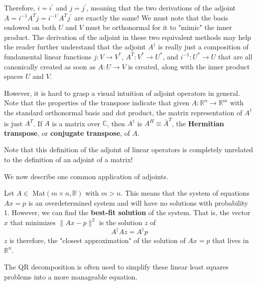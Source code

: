   Therefore, $i = i^\prime$ and $j = j^\prime$, meaning that the two derivations of the adjoint $A = i^{-1} A^T j = i^{-1 \prime} A^T j^\prime$ are exactly the same! We must note that the basis endowed on both $U$ and $V$ must be orthonormal for it to "mimic" the inner product. The derivation of the adjoint in these two equivalent methods may help the reader further understand that the adjoint $A^\dagger$ is really just a composition of fundamental linear functions $j: V \longrightarrow V^\ast$, $A^T: V^\ast \longrightarrow U^\ast$, and $i^{-1}: U^\ast \longrightarrow U$ that are all canonically created as soon as $A: U \longrightarrow V$ is created, along with the inner product spaces $U$ and $V$. 

  However, it is hard to grasp a visual intuition of adjoint operators in general. Note that the properties of the transpose indicate that given $A: \mathbb{R}^n \longrightarrow \mathbb{R}^m$ with the standard orthonormal basis and dot product, the matrix representation of $A^\dagger$ is just $A^T$. If $A$ is a matrix over $\mathbb{C}$, then $A^\dagger$ is $A^H \equiv \bar{A}^T$, the \textbf{Hermitian transpose}, or \textbf{conjugate transpose}, of $A$. 

  Note that this definition of the adjoint of linear operators is completely unrelated to the definition of an adjoint of a matrix! 

  We now describe one common application of adjoints. 
  \begin{theorem}
    Let $A \in$ Mat$(m \times n, \mathbb{R})$ with $m > n$. This means that the system of equations $A x = p$ is an overdetermined system and will have no solutions with probability 1. However, we can find the \textbf{best-fit solution} of the system. That is, the vector $x$ that minimizes $\|A x -p\|^2$ is the solution $z$ of 
    \begin{equation}
      A^\dagger A z = A^\dagger p
    \end{equation}
    $z$ is therefore, the "closest approximation" of the solution of $A x = p$ that lives in $\mathbb{R}^n$. 
  \end{theorem}

  The QR decomposition is often used to simplify these linear least squares problems into a more manageable equation. 

